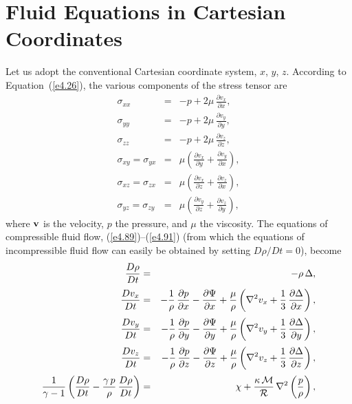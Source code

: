 \section{Fluid Equations in Cartesian Coordinates}\label{sx2.18}
Let us adopt the conventional Cartesian coordinate system, $x$, $y$, $z$. According to Equation~(\ref{e4.26}), the various components
of the stress tensor are
\begin{eqnarray}
\sigma_{xx} &=& -p + 2\mu\,\frac{\partial v_x}{\partial x},\\[0.5ex]
\sigma_{yy} &=& -p + 2\mu\,\frac{\partial v_y}{\partial y},\\[0.5ex]
\sigma_{zz} &=& -p + 2\mu\,\frac{\partial v_z}{\partial z},\\[0.5ex]
\sigma_{xy}=\sigma_{yx} &=& \mu\left(\frac{\partial v_x}{\partial y}+\frac{\partial v_y}{\partial x}\right),\\[0.5ex]
\sigma_{xz}=\sigma_{zx} &=& \mu\left(\frac{\partial v_x}{\partial z}+\frac{\partial v_z}{\partial x}\right),\\[0.5ex]
\sigma_{yz}=\sigma_{zy} &=& \mu\left(\frac{\partial v_y}{\partial z}+\frac{\partial v_z}{\partial y}\right),
\end{eqnarray}
where ${\bf v}$ is the  velocity, $p$  the pressure, and $\mu$ the viscosity. The equations of compressible
fluid flow, (\ref{e4.89})--(\ref{e4.91}) (from which the equations of incompressible fluid flow
can easily be obtained by setting $D\rho/Dt=0$), become
\begin{eqnarray}
\frac{D\rho}{Dt} &=&-\rho\,\Delta,\\[0.5ex]
\frac{Dv_x}{Dt}&=& - \frac{1}{\rho}\,\frac{\partial p}{\partial x} - \frac{\partial\Psi}{\partial x}
+ \frac{\mu}{\rho}\left(\nabla^2 v_x + \frac{1}{3}\,\frac{\partial\Delta}{\partial x}\right),\\[0.5ex]
\frac{Dv_y}{Dt}&=& - \frac{1}{\rho}\,\frac{\partial p}{\partial y} - \frac{\partial\Psi}{\partial y}
+ \frac{\mu}{\rho}\left(\nabla^2 v_y + \frac{1}{3}\,\frac{\partial\Delta}{\partial y}\right),\\[0.5ex]
\frac{Dv_z}{Dt}&=& - \frac{1}{\rho}\,\frac{\partial p}{\partial z} - \frac{\partial\Psi}{\partial z}
+ \frac{\mu}{\rho}\left(\nabla^2 v_z + \frac{1}{3}\,\frac{\partial\Delta}{\partial z}\right),\\[0.5ex]
\frac{1}{\gamma-1}\left(\frac{D\rho}{Dt} - \frac{\gamma\,p}{\rho}\,\frac{D\rho}{Dt}\right)
&=&\chi + \frac{\kappa\,{\cal M}}{{\cal R}}\,\nabla^2\left(\frac{p}{\rho}\right),
\end{eqnarray}
